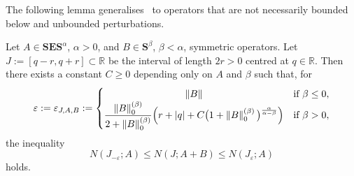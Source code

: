 \documentclass[AHL,Unicode,longabstracts,published]{cedram}
\newcommand{\R}{\mathbb R}
\newcommand{\BE}{\mathbf E}
\newcommand{\BS}{\mathbf S}
\renewcommand{\epsilon}{\varepsilon}
\newcommand{\abs}[1]{\left\lvert #1 \right\rvert}
\newcommand{\norm}[1]{\left\| #1 \right\|}
\newcommand{\snorm}[3]{\left\| #1\right\|_{#3}^{(#2)}}
\begin{document}
The following lemma generalises~\cite[Corollary~4.3]{ParSht2012} to operators that are not necessarily bounded below and unbounded perturbations.

\begin{lemm} \label{lem:monotonicity}
Let $A\in\BS\BE\BS^\alpha$, $\alpha>0$, and $B\in\BS^\beta$, $\beta<\alpha$, symmetric operators. Let $J:=[q-r,q+r]\subset \R$ be the interval of length $2r > 0$ centred at $q\in\R$. Then there exists a constant $C\geq 0$ depending only on $A$ and $\beta$ such that, for
\begin{equation}\label{eq:epsa}
\epsilon:=\epsilon_{J,A,B}:=
\begin{cases}
\hfill\norm{B}\hfill & \text{if }\beta \leq 0,\\
\dfrac{\snorm{B}{\beta}{0}}{2 +\snorm{B}{\beta}{0}}\Big(r + \abs q+ C\big(1+\snorm{B}{\beta}{0}\big)^{\frac{\alpha}{\alpha-\beta}}\Big)& \text{if } \beta>0,
\end{cases}
\end{equation}
the inequality
\begin{equation}\label{eq:bounds}
N(J_{-\epsilon}; A)\leq N(J; A+B)\leq N(J_{\epsilon}; A)
\end{equation}
holds.
\end{lemm}
\end{document}
